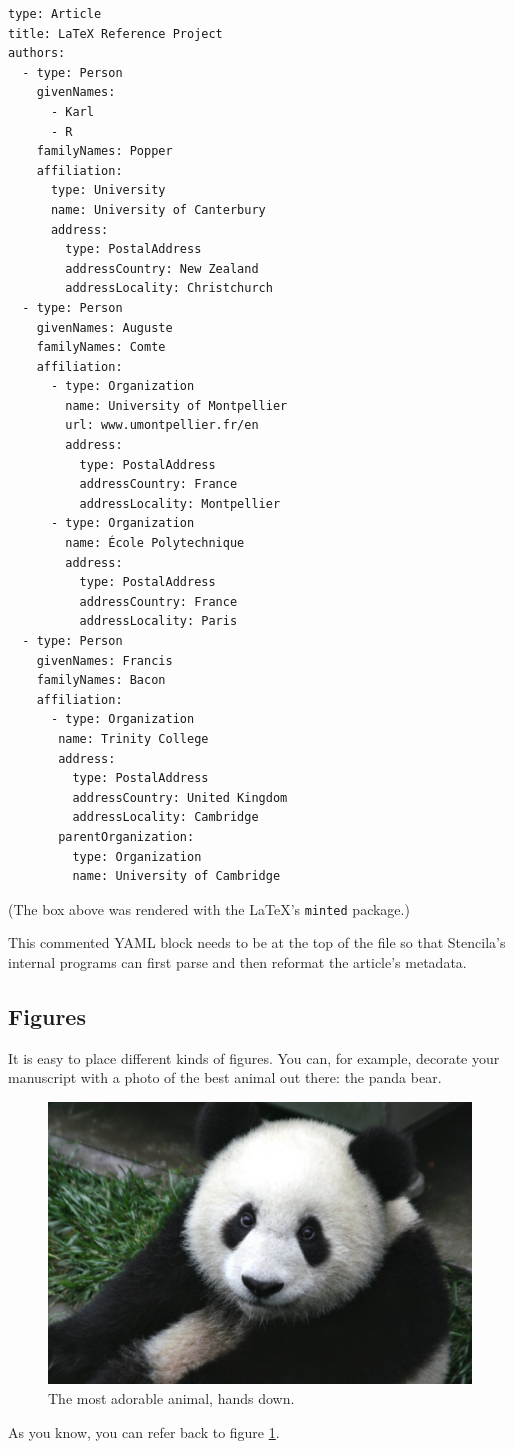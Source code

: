 \documentclass[12pt]{article}
\begin{document}
{\singlespace
\begin{verbatim}
type: Article
title: LaTeX Reference Project
authors:
  - type: Person
    givenNames:
      - Karl
      - R
    familyNames: Popper
    affiliation:
      type: University
      name: University of Canterbury
      address:
        type: PostalAddress
        addressCountry: New Zealand
        addressLocality: Christchurch
  - type: Person
    givenNames: Auguste
    familyNames: Comte
    affiliation:
      - type: Organization
        name: University of Montpellier
        url: www.umontpellier.fr/en
        address:
          type: PostalAddress
          addressCountry: France
          addressLocality: Montpellier
      - type: Organization
        name: École Polytechnique      
        address:
          type: PostalAddress
          addressCountry: France
          addressLocality: Paris
  - type: Person
    givenNames: Francis
    familyNames: Bacon
    affiliation:
      - type: Organization
       name: Trinity College
       address:
         type: PostalAddress
         addressCountry: United Kingdom
         addressLocality: Cambridge
       parentOrganization:
         type: Organization
         name: University of Cambridge
\end{verbatim}
}

\noindent (The box above was rendered with the \LaTeX 's \texttt{minted}
package.)

This commented YAML block needs to be at the top of the file so that
Stencila's internal programs can first parse and then reformat the
article's metadata.

\subsection*{Figures}

It is easy to place different kinds of figures.
You can, for example, decorate your manuscript with a photo of the
best animal out there: the panda bear.

\begin{figure}
  \centering
  \includegraphics[width=12cm]{figs/pandacub.jpeg}
  \caption{The most adorable animal, hands down.}
  \label{fig:panda}
\end{figure}  

As you know, you can refer back to figure \ref{fig:panda}.
\end{document}
